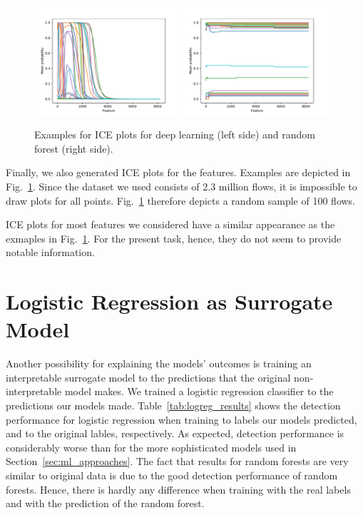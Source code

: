 \documentclass[sigconf,nonacm]{acmart}
\begin{document}
\begin{figure}[p]
\includegraphics[width=0.48\textwidth]{plots/ice/apply(stdev(ipTotalLength),forward)_nn_0.pdf}
\includegraphics[width=0.48\textwidth]{plots/ice/apply(stdev(ipTotalLength),forward)_rf_0.pdf}

\caption{Examples for ICE plots for deep learning (left side) and random forest (right side).}
\label{fig:ice}
\end{figure}

Finally, we also generated ICE plots for the features. Examples are depicted in Fig.~\ref{fig:ice}. Since the dataset we used consists of 2.3 million flows, it is impossible to draw plots for all points. Fig.~\ref{fig:ice} therefore depicts a random sample of 100 flows.

ICE plots for most features we considered have a similar appearance as the exmaples in Fig.~\ref{fig:ice}. For the present task, hence, they do not seem to provide notable information.

\section{Logistic Regression as Surrogate Model}
Another possibility for explaining the models' outcomes is training an interpretable surrogate model to the predictions that the original non-interpretable model makes. We trained a logistic regression classifier to the predictions our models made. Table~\ref{tab:logreg_results} shows the detection performance for logistic regression when training to labels our models predicted, and to the original lables, respectively. As expected, detection performance is considerably worse than for the more sophisticated models used in Section~\ref{sec:ml_approaches}. The fact that results for random forests are very similar to original data is due to the good detection performance of random forests. Hence, there is hardly any difference when training with the real labels and with the prediction of the random forest.
\end{document}
